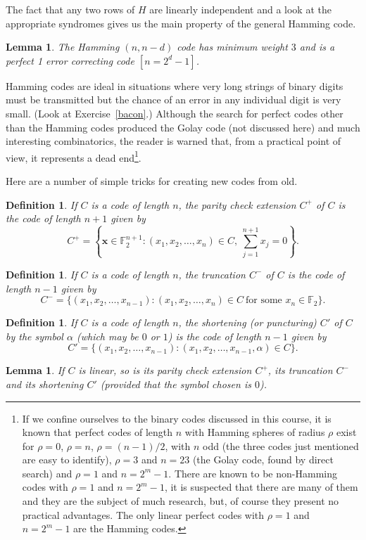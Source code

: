 \documentclass[12pt,a4paper]{article}
\theoremstyle{plain}
\newtheorem{lemma}[theorem]{Lemma}
\newtheorem{definition}[theorem]{Definition}
\theoremstyle{definition}
\begin{document}
    The fact that any two rows of $H$ are linearly
    independent and a look at the appropriate syndromes
    gives us the main property of the general Hamming code.
    \begin{lemma}
        The Hamming $(n,n-d)$ code
        has minimum weight $3$ and is a perfect
        1 error correcting code $[n=2^{d}-1]$.
    \end{lemma}
    Hamming codes are ideal in situations where
    very long strings of binary digits must be transmitted
    but the chance of an error in any individual
    digit is very small. (Look at Exercise~\ref{bacon}.)
    Although the search for perfect codes other than the Hamming codes
    produced
    the Golay code (not discussed here) and much interesting
    combinatorics, the reader is warned that, from a practical
    point of view, it represents a dead
    end\footnote{If we confine ourselves to the binary
    codes discussed in this course, it is known
    that perfect codes of length $n$ with Hamming spheres of radius
    $\rho$ exist for $\rho=0$, $\rho=n$, $\rho=(n-1)/2$,
    with $n$ odd (the three codes just mentioned are
    easy to identify), $\rho=3$ and $n=23$ (the Golay code,
    found by direct search) and $\rho=1$ and $n=2^{m}-1$.
    There are known to be non-Hamming codes with  $\rho=1$ and $n=2^{m}-1$,
    it is suspected that there are many of them and
    they are the subject of much research, but,
    of course they present no practical advantages.
    The only linear perfect codes with $\rho=1$ and $n=2^{m}-1$
    are the Hamming codes.}.

    Here are a number of simple tricks for creating new
    codes from old.
    \begin{definition}
        If $C$ is a code of
        length $n$, the \emph{parity check extension}
        $C^{+}$ of $C$ is the code of length $n+1$ given by
        \[C^{+}=\left\{{\mathbf x}\in{\mathbb F}_{2}^{n+1}:
        (x_{1},x_{2},\dots,x_{n})\in C,\ \sum_{j=1}^{n+1}x_{j}=0
        \right\}.\]
    \end{definition}
    \begin{definition}
        If $C$ is a code of
        length $n$, the \emph{truncation}
        $C^{-}$ of $C$ is the code of length $n-1$ given by
        \[C^{-}=\{(x_{1},x_{2},\dots,x_{n-1}):
        (x_{1},x_{2},\dots,x_{n})\in C
        \ \text{for some $x_{n}\in{\mathbb F}_{2}$}\}.\]
    \end{definition}
    \begin{definition}
        If $C$ is a code of
        length $n$, the \emph{shortening} (or \emph{puncturing})
        $C'$ of $C$ by the symbol $\alpha$ (which may be $0$
        or $1$)
        is the code of length $n-1$ given by
        \[C'=\{(x_{1},x_{2},\dots,x_{n-1}):
        (x_{1},x_{2},\dots,x_{n-1},\alpha)\in C\}.\]
    \end{definition}
    \begin{lemma}
        If $C$ is linear, so is its
        parity check extension $C^{+}$, its
        truncation $C^{-}$ and its shortening $C'$ (provided
        that the symbol chosen is $0$).
    \end{lemma}
\end{document}
